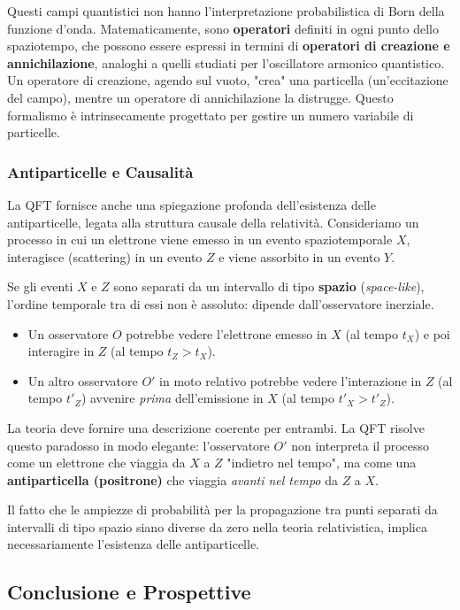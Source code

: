 Questi campi quantistici non hanno l'interpretazione probabilistica di Born della funzione d'onda. Matematicamente, sono \textbf{operatori} definiti in ogni punto dello spaziotempo, che possono essere espressi in termini di \textbf{operatori di creazione e annichilazione}, analoghi a quelli studiati per l'oscillatore armonico quantistico. Un operatore di creazione, agendo sul vuoto, "crea" una particella (un'eccitazione del campo), mentre un operatore di annichilazione la distrugge. Questo formalismo è intrinsecamente progettato per gestire un numero variabile di particelle.

\subsubsection{Antiparticelle e Causalità}

La QFT fornisce anche una spiegazione profonda dell'esistenza delle antiparticelle, legata alla struttura causale della relatività.
Consideriamo un processo in cui un elettrone viene emesso in un evento spaziotemporale $X$, interagisce (scattering) in un evento $Z$ e viene assorbito in un evento $Y$.

Se gli eventi $X$ e $Z$ sono separati da un intervallo di tipo \textbf{spazio} (\textit{space-like}), l'ordine temporale tra di essi non è assoluto: dipende dall'osservatore inerziale.
\begin{itemize}
    \item Un osservatore $O$ potrebbe vedere l'elettrone emesso in $X$ (al tempo $t_X$) e poi interagire in $Z$ (al tempo $t_Z > t_X$).
    \item Un altro osservatore $O'$ in moto relativo potrebbe vedere l'interazione in $Z$ (al tempo $t'_Z$) avvenire \textit{prima} dell'emissione in $X$ (al tempo $t'_X > t'_Z$).
\end{itemize}

La teoria deve fornire una descrizione coerente per entrambi. La QFT risolve questo paradosso in modo elegante: l'osservatore $O'$ non interpreta il processo come un elettrone che viaggia da $X$ a $Z$ "indietro nel tempo", ma come una \textbf{antiparticella (positrone)} che viaggia \textit{avanti nel tempo} da $Z$ a $X$.

Il fatto che le ampiezze di probabilità per la propagazione tra punti separati da intervalli di tipo spazio siano diverse da zero nella teoria relativistica, implica necessariamente l'esistenza delle antiparticelle.


\subsection{Conclusione e Prospettive}

